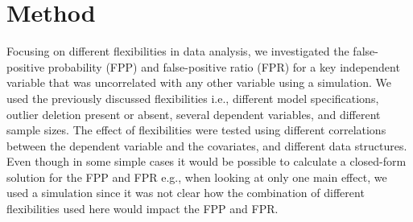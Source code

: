 \section{Method}
Focusing on different flexibilities in data analysis, we investigated the false-positive probability (FPP) and false-positive ratio (FPR) for a key independent variable that was uncorrelated with any other variable using a simulation. We used the previously discussed flexibilities i.e., different model specifications, outlier deletion present or absent, several dependent variables, and different sample sizes. The effect of flexibilities were tested using different correlations between the dependent variable and the covariates, and different data structures. Even though in some simple cases it would be possible to calculate a closed-form solution for the FPP and FPR e.g., when looking at only one main effect, we used a simulation since it was not clear how the combination of different flexibilities used here would impact the FPP and FPR.\\

